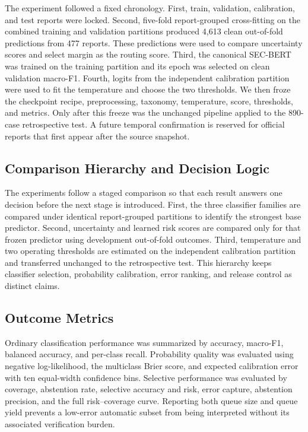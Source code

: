 \documentclass[11pt]{article}
\begin{document}
The experiment followed a fixed chronology. First, train, validation, calibration,
and test reports were locked. Second, five-fold report-grouped cross-fitting on the
combined training and validation partitions produced 4,613 clean out-of-fold
predictions from 477 reports. These predictions were used to compare uncertainty
scores and select margin as the routing score. Third, the canonical SEC-BERT was
trained on the training partition and its epoch was selected on clean validation
macro-F1. Fourth, logits from the independent calibration partition were used to
fit the temperature and choose the two thresholds. We then froze the checkpoint
recipe, preprocessing, taxonomy, temperature, score, thresholds, and metrics.
Only after this freeze was the unchanged pipeline applied to the 890-case
retrospective test. A future temporal confirmation is reserved for official reports
that first appear after the source snapshot.

\subsection{Comparison Hierarchy and Decision Logic}

The experiments follow a staged comparison so that each result answers one
decision before the next stage is introduced. First, the three classifier
families are compared under identical report-grouped partitions to identify the
strongest base predictor. Second, uncertainty and learned risk scores are
compared only for that frozen predictor using development out-of-fold outcomes.
Third, temperature and two operating thresholds are estimated on the independent
calibration partition and transferred unchanged to the retrospective test. This
hierarchy keeps classifier selection, probability calibration, error ranking,
and release control as distinct claims.

\subsection{Outcome Metrics}

Ordinary classification performance was summarized by accuracy, macro-F1,
balanced accuracy, and per-class recall. Probability quality was evaluated using
negative log-likelihood, the multiclass Brier score, and expected calibration error
with ten equal-width confidence bins. Selective performance was evaluated by
coverage, abstention rate, selective accuracy and risk, error capture, abstention
precision, and the full risk--coverage curve. Reporting both queue size and queue
yield prevents a low-error automatic subset from being interpreted without its
associated verification burden.
\end{document}

